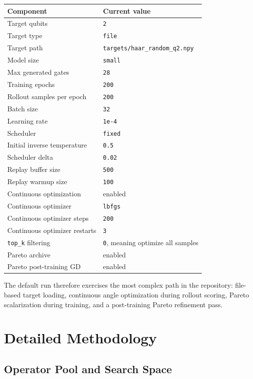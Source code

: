 \documentclass[11pt]{article}
\begin{document}
\begin{center}
\begin{tabular}{ll}
\toprule
Component & Current value \\
\midrule
Target qubits & \texttt{2} \\
Target type & \texttt{file} \\
Target path & \texttt{targets/haar\_random\_q2.npy} \\
Model size & \texttt{small} \\
Max generated gates & \texttt{28} \\
Training epochs & \texttt{200} \\
Rollout samples per epoch & \texttt{200} \\
Batch size & \texttt{32} \\
Learning rate & \texttt{1e-4} \\
Scheduler & \texttt{fixed} \\
Initial inverse temperature & \texttt{0.5} \\
Scheduler delta & \texttt{0.02} \\
Replay buffer size & \texttt{500} \\
Replay warmup size & \texttt{100} \\
Continuous optimization & enabled \\
Continuous optimizer & \texttt{lbfgs} \\
Continuous optimizer steps & \texttt{200} \\
Continuous optimizer restarts & \texttt{3} \\
\texttt{top\_k} filtering & \texttt{0}, meaning optimize all samples \\
Pareto archive & enabled \\
Pareto post-training GD & enabled \\
\bottomrule
\end{tabular}
\end{center}

The default run therefore exercises the most complex path in the repository: file-based target loading, continuous angle optimization during rollout scoring, Pareto scalarization during training, and a post-training Pareto refinement pass.

\section{Detailed Methodology}

\subsection{Operator Pool and Search Space}
\end{document}
